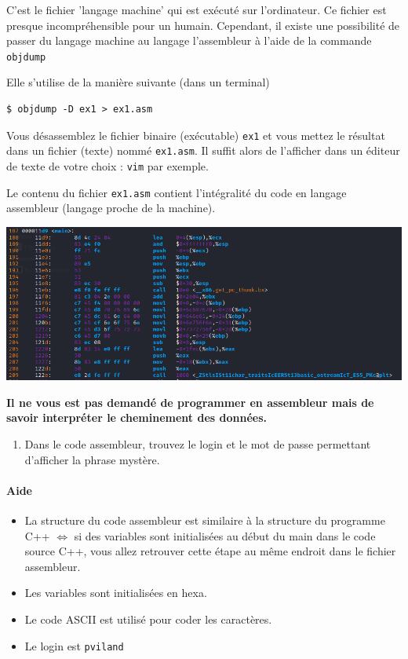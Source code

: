 \documentclass[french, 12pt]{article}%
\newcommand{\itemE}{\item[$\bullet$]}
\begin{document}
C'est le fichier 'langage machine' qui est exécuté sur l'ordinateur. Ce fichier est presque incompréhensible pour un humain. Cependant, il existe une possibilité de passer du langage machine au langage l'assembleur à l'aide de la commande  \verb?objdump?

Elle s'utilise de la manière suivante (dans un terminal)

\begin{lstlisting}[style=commande]
$ objdump -D ex1 > ex1.asm
\end{lstlisting}

Vous désassemblez le fichier binaire (exécutable) \verb?ex1? et vous mettez le résultat dans un fichier (texte) nommé \verb?ex1.asm?. Il suffit alors de l'afficher dans un éditeur de texte de votre choix : \verb?vim? par exemple. 

Le contenu du fichier \verb?ex1.asm? contient l'intégralité du code en langage assembleur (langage proche de la machine). 

\begin{center}
\includegraphics[scale=0.5]{./ressource/code_asm_ex1.png}
\end{center}

\textbf{Il ne vous est pas demandé de programmer en assembleur mais de savoir interpréter le cheminement des données. }


\begin{enumerate}[resume]
\item Dans le code assembleur, trouvez le login et le mot de passe permettant d'afficher la phrase mystère.  
\end{enumerate}
\paragraph{Aide}
\begin{itemize}
\itemE La structure du code assembleur est similaire à la structure du programme C++ $\Leftrightarrow$ si des variables sont initialisées au début du main dans le code source C++, vous allez retrouver cette étape au même endroit dans le fichier assembleur. 
\itemE Les variables sont initialisées en hexa. 
\itemE Le code ASCII est utilisé pour coder les caractères.
\itemE Le login est \verb?pviland?
\end{itemize}
\end{document}
